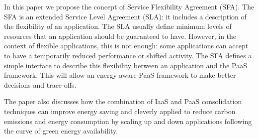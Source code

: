 In this paper we propose the concept of Service Flexibility Agreement (SFA). 
The SFA is an extended Service Level Agreement (SLA): it includes a description of the flexibility of an application.
The SLA usually define minimum levels of resources that an application should be guaranteed to have.
However, in the context of flexible applications, this is not enough: some applications can accept to have a temporarily reduced performance or shifted activity. %
The SFA defines a simple interface to describe this flexibility between an application and the PaaS framework. 
This will allow an energy-aware PaaS framework to make better decisions and trace-offs. %

The paper also discusses how the combination of IaaS and PaaS consolidation techniques can improve energy saving and cleverly applied to reduce carbon emissions and energy consumption by scaling up and down applications following the curve of green energy availability. %






